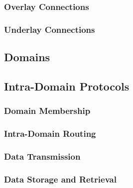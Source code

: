 \subsubsection{Overlay Connections}

\subsubsection{Underlay Connections}

\subsection{Domains}

\subsection{Intra-Domain Protocols}

\subsubsection{Domain Membership}

\subsubsection{Intra-Domain Routing}

\subsubsection{Data Transmission}

\subsubsection{Data Storage and Retrieval}

